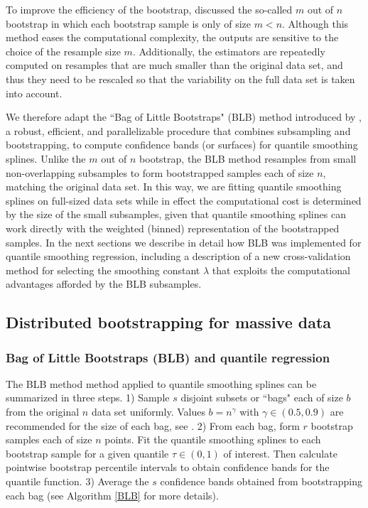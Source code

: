 \documentclass{statsoc}
\begin{document}
To improve the efficiency of the bootstrap, \citet{bickel2008choice} discussed the so-called $m$ out of $n$ bootstrap in which each bootstrap sample is only of size $m<n$. Although this method eases the computational complexity, the outputs are sensitive to the choice of the resample size $m$. Additionally, the estimators are repeatedly computed on resamples that are much smaller than the original data set, and thus they need to be rescaled so that the variability on the full data set is taken into account. 

We therefore adapt the ``Bag of Little Bootstraps" (BLB) method introduced by \citet{kleiner2014scalable}, a robust, efficient, and parallelizable procedure that combines subsampling and bootstrapping, to compute confidence bands (or surfaces) for quantile smoothing splines. Unlike the $m$ out of $n$ bootstrap, the BLB method resamples from small non-overlapping subsamples to form bootstrapped samples each of size $n$, matching the original data set. In this way, we are fitting quantile smoothing splines on full-sized data sets while in effect the computational cost is determined by the size of the small subsamples, given that quantile smoothing splines can work directly with the weighted (binned) representation of the bootstrapped samples. In the next sections we describe in detail how BLB was implemented for quantile smoothing regression, including a description of a new cross-validation method for selecting the smoothing constant $\lambda$ that exploits the computational advantages afforded by the BLB subsamples. 

\subsection{Distributed bootstrapping for massive data}
\subsubsection{Bag of Little Bootstraps (BLB) and quantile regression}

The BLB method method applied to quantile smoothing splines can be summarized in three steps. 1) Sample $s$ disjoint subsets or ``bags" each of size $b$ from the original $n$ data set uniformly. Values $b=n^{\gamma}$ with $\gamma\in (0.5,0.9)$ are recommended for the size of each bag, see \citet{kleiner2014scalable}. 2) From each bag, form $r$ bootstrap samples each of size $n$ points. Fit the quantile smoothing splines to each bootstrap sample for a given quantile $\tau\in (0,1)$ of interest. Then calculate pointwise bootstrap percentile intervals to obtain confidence bands for the quantile function. 3) Average the $s$ confidence bands obtained from bootstrapping each bag (see Algorithm \ref{BLB} for more details).
\end{document}
